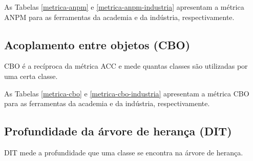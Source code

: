 As Tabelas \ref{metrica-anpm} e \ref{metrica-anpm-industria} apresentam a
métrica ANPM para as ferramentas da academia e da indústria, respectivamente.



\subsection{Acoplamento entre objetos (CBO)}

CBO é a recíproca da métrica ACC e mede quantas classes são utilizadas por uma
certa classe.

As Tabelas \ref{metrica-cbo} e \ref{metrica-cbo-industria} apresentam a
métrica CBO para as ferramentas da academia e da indústria, respectivamente.



\subsection{Profundidade da árvore de herança (DIT)}

DIT mede a profundidade que uma classe se encontra na árvore de herança.


